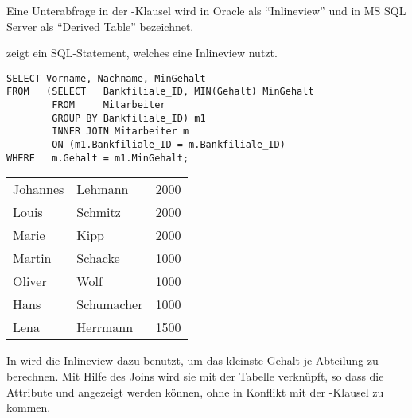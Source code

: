       \begin{merke}
        Eine Unterabfrage in der \FROM-Klausel wird in Oracle als \enquote{Inlineview} und in MS SQL Server als \enquote{Derived Table} bezeichnet.
      \end{merke}
       zeigt ein SQL-Statement, welches eine Inlineview nutzt.
      \begin{lstlisting}[language=oracle_sql,caption={Eine Inlineview},label=sql06_10]
SELECT Vorname, Nachname, MinGehalt
FROM   (SELECT   Bankfiliale_ID, MIN(Gehalt) MinGehalt
        FROM     Mitarbeiter
        GROUP BY Bankfiliale_ID) m1
        INNER JOIN Mitarbeiter m
        ON (m1.Bankfiliale_ID = m.Bankfiliale_ID)
WHERE   m.Gehalt = m1.MinGehalt;
      \end{lstlisting}
      \begin{center}
        \begin{small}
          \tablehead{}
          \tabletail {
          }
          \begin{msoraclesql}
            \begin{supertabular}{llr}
              Johannes & Lehmann & 2000 \\
              Louis & Schmitz & 2000 \\
              Marie & Kipp & 2000 \\
              Martin & Schacke & 1000 \\
              Oliver & Wolf & 1000 \\
              Hans & Schumacher & 1000 \\
              Lena & Herrmann & 1500 \\
            \end{supertabular}
          \end{msoraclesql}
        \end{small}
      \end{center}
      In  wird die Inlineview dazu benutzt, um das kleinste Gehalt je Abteilung zu berechnen. Mit Hilfe des Joins wird sie mit der Tabelle  verknüpft, so dass die Attribute  und  angezeigt werden können, ohne in Konflikt mit der \GROUPBY-Klausel zu kommen.

